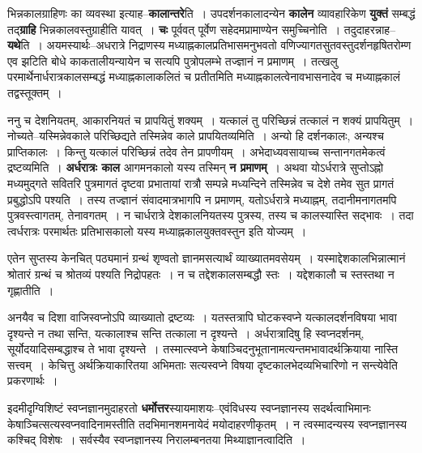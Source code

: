 \documentclass[article,12pt,a4paper]{memoir}
\begin{document}
	  \pstart भिन्नकालग्राहिणः का व्यवस्था इत्याह--\textbf{कालान्तरे}ति । उपदर्शनकालादन्येन \textbf{कालेन} व्यावहारिकेण \textbf{युक्तं} सम्बद्धं तद्\textbf{ग्राहि} भिन्नकालवस्तुग्राहीति यावत् । \textbf{चः} पूर्ववत् पूर्वेण सहेदमप्रामाण्येन समुच्चिनोति । तदुदाहरन्नाह--\textbf{यथे}ति । अयमस्यार्थः--अधरात्रे निद्राणस्य मध्याह्नकालप्रतिभासमनुभवतो वणिज्यागतसुतवस्तुदर्शनहृषितरोम्ण एव झटिति बोधे काकतालीयन्यायेन च सत्यपि पुत्रोपलम्भे तज्ज्ञानं न प्रमाणम् । तत्खलु परमार्थेनार्धरात्रकालसम्बद्धं मध्याह्नकालाकलितं च प्रतीतमिति मध्याह्नकालत्वेनावभासनादेव च मध्याह्नकालं तद्वस्तूक्तम् ।  \leavevmode{} 
	  
	ननु च देशनियतम्, आकारनियतं च प्रापयितुं शक्यम् । यत्कालं तु परिच्छिन्नं तत्कालं न शक्यं प्रापयितुम् । नोच्यते--यस्मिन्नेवकाले परिच्छिद्यते तस्मिन्नेव काले प्रापयितव्यमिति । अन्यो हि दर्शनकालः, अन्यश्च प्राप्तिकालः । किन्तु यत्कालं परिच्छिन्नं तदेव तेन प्रापणीयम् । अभेदाध्यवसायाच्च सन्तानगतमेकत्वं द्रष्टव्यमिति । \textbf{अर्धरात्रः काल} आगमनकालो यस्य तस्मिन् \textbf{न प्रमाणम्} । अथवा योऽर्धरात्रे सुप्तोऽह्नो मध्यमुद्गते सवितरि पुत्रमागतं दृष्टवा प्रभातायां रात्रौ सम्पन्ने मध्यन्दिने तस्मिन्नेव च देशे तमेव सुत प्रागतं प्रबुद्धोऽपि पश्यति । तस्य तज्ज्ञानं संवादमात्रभागपि न प्रमाणम्, यतोऽर्धरात्रे मध्याह्नम्, तदानीमनागतमपि पुत्रवस्त्वागतम्, तेनावगतम् । न चार्धरात्रे देशकालनियतस्य पुत्रस्य, तस्य च कालस्यास्ति सद्भावः । तदा त्वर्धरात्रः परमार्थतः प्रतिभासकालो यस्य मध्याह्नकालयुक्तवस्तुन इति योज्यम् ।
	\pend
      

	  \pstart एतेन सुप्तस्य केनचित् पठ्यमानं ग्रन्थं शृण्वतो ज्ञानमसत्यार्थं व्याख्यातमवसेयम् । यस्माद्देशकालभिन्नात्मानं श्रोतारं ग्रन्थं च श्रोतव्यं पश्यति निद्रोपहतः । न च तद्देशकालसम्बद्धौ स्तः । यद्देशकालौ च स्तस्तथा न गृह्णातीति ।
	\pend
      

	  \pstart अनयैव च दिशा वाजिस्वप्नोऽपि व्याख्यातो द्रष्टव्यः । यतस्तत्रापि घोटकस्वप्ने यत्कालदर्शनवि\leavevmode{}षया भावा दृश्यन्ते न तथा सन्ति, यत्कालाश्च सन्ति तत्काला न दृश्यन्ते । अर्धरात्रादिषु हि स्वप्नदर्शनम्, सूर्योदयादिसम्बद्धाश्च ते भावा दृश्यन्ते । तस्मात्स्वप्ने केषाञ्चिदनुभूतानामत्यन्तमभावादर्थक्रियाया नास्ति सत्त्वम् । केचित्तु अर्थक्रियाकारितया अभिमताः सत्यस्वप्ने विषया दृष्टकालभेदव्यभिचारिणो न सन्त्येवेति प्रकरणार्थः ।
	\pend
      

	  \pstart इदमीदृग्विशिष्टं स्वप्नज्ञानमुदाहरतो \textbf{धर्मोत्तर}स्यायमाशयः--एवंविधस्य स्वप्नज्ञानस्य सदर्थत्वाभिमानः केषाञ्चित्सत्यस्वप्नवादिनामस्तीति तदभिमानशमनायेदं मयोदाहरणीकृतम् । न त्वस्मादन्यस्य स्वप्नज्ञानस्य कश्चिद् विशेषः । सर्वस्यैव स्वप्नज्ञानस्य निरालम्बनतया मिथ्याज्ञानत्वादिति ।
	\pend
      
\end{document}
